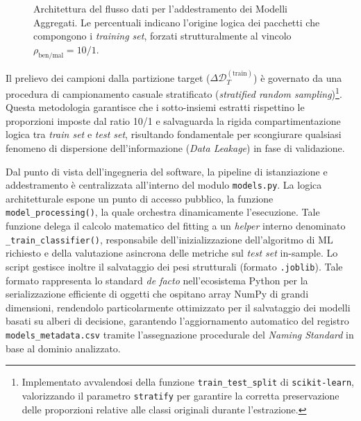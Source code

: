 \begin{figure}[H]
    \caption{Architettura del flusso dati per l'addestramento dei Modelli Aggregati. Le percentuali indicano l'origine logica dei pacchetti che compongono i \textit{training set}, forzati strutturalmente al vincolo $\rho_{\text{ben/mal}} = 10/1$.}
    \label{fig:aggregati_data_flow}
\end{figure}

Il prelievo dei campioni dalla partizione target ($\Delta\mathcal{D}_T^{(\text{train})}$) è governato da una procedura di campionamento casuale stratificato (\textit{stratified random sampling})\footnote{Implementato avvalendosi della funzione \texttt{train\_test\_split} di \texttt{scikit-learn}, valorizzando il parametro \texttt{stratify} per garantire la corretta preservazione delle proporzioni relative alle classi originali durante l'estrazione.}. 
Questa metodologia garantisce che i sotto-insiemi estratti rispettino le proporzioni imposte dal ratio 10/1 e salvaguarda la rigida compartimentazione logica tra \textit{train set} e \textit{test set}, risultando fondamentale per scongiurare qualsiasi fenomeno di dispersione dell'informazione (\textit{Data Leakage}) in fase di validazione.

Dal punto di vista dell'ingegneria del software, la pipeline di istanziazione e addestramento è centralizzata all'interno del modulo \texttt{models.py}. 
La logica architetturale espone un punto di accesso pubblico, la funzione \texttt{model\_processing()}, la quale orchestra dinamicamente l'esecuzione. 
Tale funzione delega il calcolo matematico del fitting a un \textit{helper} interno denominato \texttt{\_train\_classifier()}, responsabile dell'inizializzazione dell'algoritmo di ML richiesto e della valutazione asincrona delle metriche sul \textit{test set} in-sample. 
Lo script gestisce inoltre il salvataggio dei pesi strutturali (formato \texttt{.joblib}). Tale formato rappresenta lo standard \textit{de facto} nell'ecosistema Python per la serializzazione efficiente di oggetti che ospitano array NumPy di grandi dimensioni, rendendolo particolarmente ottimizzato per il salvataggio dei modelli basati su alberi di decisione, garantendo l'aggiornamento automatico del registro \texttt{models\_metadata.csv} tramite l'assegnazione procedurale del \textit{Naming Standard} in base al dominio analizzato.

